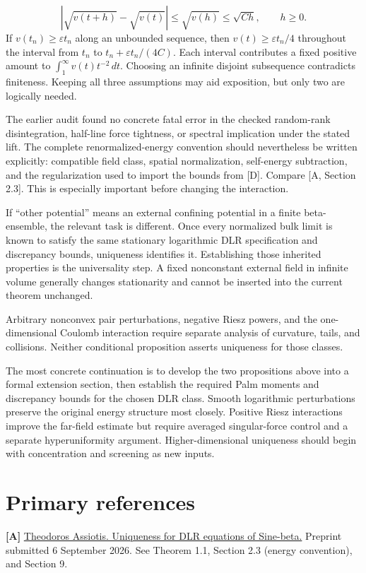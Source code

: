 \documentclass[11pt]{article}
\begin{document}
\[
|\sqrt{v(t+h)}-\sqrt{v(t)}|\leq\sqrt{v(h)}\leq\sqrt{Ch},\qquad h\geq0.
\]
If $v(t_n)\geq\varepsilon t_n$ along an unbounded sequence, then $v(t)\geq\varepsilon t_n/4$ throughout the interval from $t_n$ to $t_n+\varepsilon t_n/(4C)$. Each interval contributes a fixed positive amount to $\int_1^\infty v(t)t^{-2}\,dt$. Choosing an infinite disjoint subsequence contradicts finiteness. Keeping all three assumptions may aid exposition, but only two are logically needed.

The earlier audit found no concrete fatal error in the checked random-rank disintegration, half-line force tightness, or spectral implication under the stated lift. The complete renormalized-energy convention should nevertheless be written explicitly: compatible field class, spatial normalization, self-energy subtraction, and the regularization used to import the bounds from [D]. Compare [A, Section 2.3]. This is especially important before changing the interaction.

If ``other potential'' means an external confining potential in a finite beta-ensemble, the relevant task is different. Once every normalized bulk limit is known to satisfy the same stationary logarithmic DLR specification and discrepancy bounds, uniqueness identifies it. Establishing those inherited properties is the universality step. A fixed nonconstant external field in infinite volume generally changes stationarity and cannot be inserted into the current theorem unchanged.

Arbitrary nonconvex pair perturbations, negative Riesz powers, and the one-dimensional Coulomb interaction require separate analysis of curvature, tails, and collisions. Neither conditional proposition asserts uniqueness for those classes.

The most concrete continuation is to develop the two propositions above into a formal extension section, then establish the required Palm moments and discrepancy bounds for the chosen DLR class. Smooth logarithmic perturbations preserve the original energy structure most closely. Positive Riesz interactions improve the far-field estimate but require averaged singular-force control and a separate hyperuniformity argument. Higher-dimensional uniqueness should begin with concentration and screening as new inputs.

\section*{Primary references}
\textbf{[A]} \href{https://arxiv.org/abs/2609.06832}{Theodoros Assiotis. Uniqueness for DLR equations of Sine-beta.} Preprint submitted 6 September 2026. See Theorem 1.1, Section 2.3 (energy convention), and Section 9.
\end{document}
